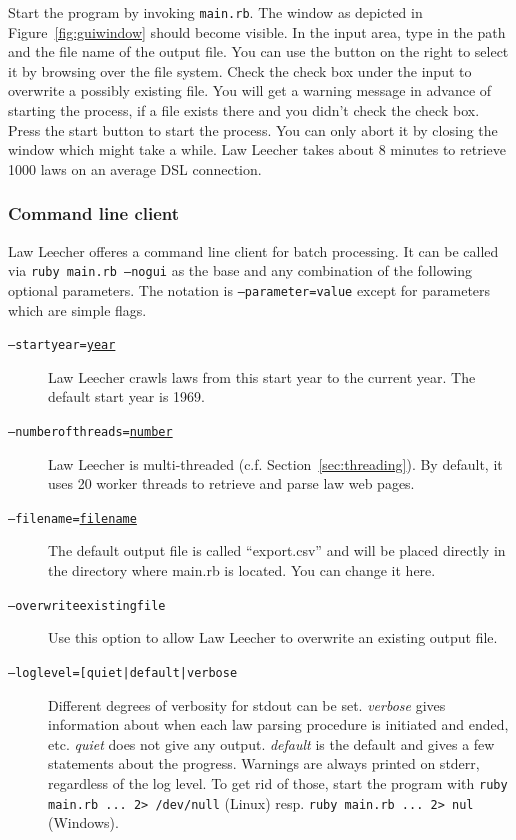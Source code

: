 \documentclass{scrartcl}
\begin{document}
Start the program by invoking \texttt{main.rb}. The window as depicted in Figure~\ref{fig:guiwindow} should become visible. In the input area, type in the path and the file name of the output file. You can use the button on the right to select it by browsing over the file system. Check the check box under the input to overwrite a possibly existing file. You will get a warning message in advance of starting the process, if a file exists there and you didn't check the check box. Press the start button to start the process. You can only abort it by closing the window which might take a while. Law Leecher takes about 8 minutes to retrieve 1000 laws on an average DSL connection.

\subsubsection{Command line client}
Law Leecher offeres a command line client for batch processing. It can be called via \texttt{ruby main.rb ---nogui} as the base and any combination of the following optional parameters. The notation is \texttt{---parameter=value} except for parameters which are simple flags.
\begin{description}
\item[\texttt{---startyear=\underline{year}}] Law Leecher crawls laws from this start year to the current year. The default start year is 1969.
\item[\texttt{---numberofthreads=\underline{number}}] Law Leecher is multi-threaded (c.f. Section~\ref{sec:threading}). By default, it uses 20 worker threads to retrieve and parse law web pages.
\item[\texttt{---filename=\underline{filename}}] The default output file is called ``export.csv'' and will be placed directly in the directory where main.rb is located. You can change it here.
\item[\texttt{---overwriteexistingfile}] Use this option to allow Law Leecher to overwrite an existing output file.
\item[\texttt{---loglevel=[quiet|default|verbose\rbrack}] Different degrees of verbosity for stdout can be set. \textit{verbose} gives information about when each law parsing procedure is initiated and ended, etc. \textit{quiet} does not give any output. \textit{default} is the default and gives a few statements about the progress. Warnings are always printed on stderr, regardless of the log level. To get rid of those, start the program with \texttt{ruby main.rb ... 2> /dev/null} (Linux) resp. \texttt{ruby main.rb ... 2> nul} (Windows).
\end{description}
\end{document}
